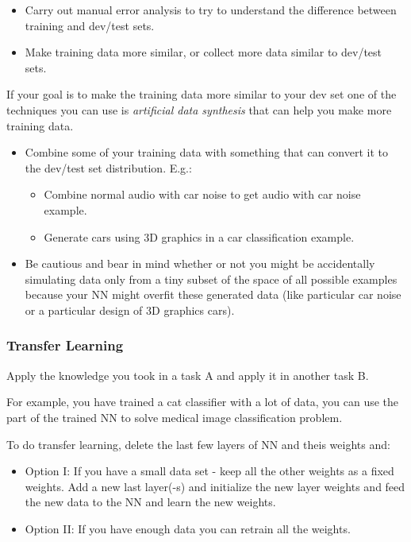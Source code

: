 \begin{itemize}
    \item Carry out manual error analysis to try to understand the difference between training and dev/test sets.
    \item Make training data more similar, or collect more data similar to dev/test sets.
\end{itemize}

If your goal is to make the training data more similar to your dev set one of the techniques you can use is \textit{artificial data synthesis} that can help you make more training data.

\begin{itemize}
    \item Combine some of your training data with something that can convert it to the dev/test set distribution. E.g.:
    \begin{itemize}
        \item Combine normal audio with car noise to get audio with car noise example.
        \item Generate cars using 3D graphics in a car classification example.
    \end{itemize}
    \item Be cautious and bear in mind whether or not you might be accidentally simulating data only from a tiny subset of the space of all possible examples because your NN might overfit these generated data (like particular car noise or a particular design of 3D graphics cars).
\end{itemize}

\subsubsection{Transfer Learning}
Apply the knowledge you took in a task A and apply it in another task B.

For example, you have trained a cat classifier with a lot of data, you can use the part of the trained NN to solve medical image classification problem.

To do transfer learning, delete the last few layers of NN and theis weights and:

\begin{itemize}
    \item Option I: If you have a small data set - keep all the other weights as a fixed weights. Add a new last layer(-s) and initialize the new layer weights and feed the new data to the NN and learn the new weights.
    \item Option II: If you have enough data you can retrain all the weights.
\end{itemize}

